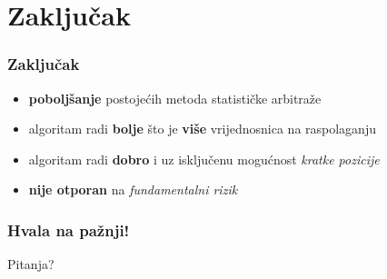 \documentclass[11pt, notheorems]{beamer}
\begin{document}
  \section{Zaključak}
  \begin{frame}
    \frametitle{Zaključak}
    \begin{itemize}
      \item \textbf{poboljšanje} postojećih metoda statističke arbitraže
      \item algoritam radi \textbf{bolje} što je \textbf{više} vrijednosnica na raspolaganju
      \item algoritam radi \textbf{dobro} i uz isključenu mogućnost \emph{kratke pozicije}
      \item \textbf{nije otporan} na \emph{fundamentalni rizik}
    \end{itemize}
  \end{frame}

  \begin{frame}
    \frametitle{Hvala na pažnji!}
    \centering \Huge Pitanja?
\end{frame}
  
\end{document}
